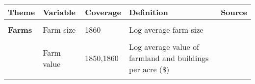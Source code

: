 \begin{tabular}{@{}l|llll@{}}
\hline\hline
\textbf{Theme}                     & \textbf{Variable}                                           & \textbf{Coverage}                     & \textbf{Definition}     & \textbf{Source}                            											     \\
\hline
                                   &                                                             &                                    &             &                                                                                                                                                                                                   \\                                                            
\textbf{Farms} 	      & Farm size          & 1860                        & Log average farm size           & \citet{haines2010}                                                                                                                                                    \\                               
                                     &                                                             &                            &               &            \\     
		&  Farm value                                               &  1850,1860                           & Log average value of farmland and buildings per acre (\$)          & \citet{haines2010}             \\    
                                   &                                                             &                                 &             &                                                                                                                                                                                                   \\                                           

\end{tabular}
